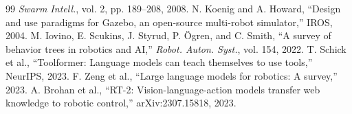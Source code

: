 \documentclass[10pt,twocolumn]{article}
\begin{document}
\begin{thebibliography}{99}
\emph{Swarm Intell.}, vol. 2, pp. 189--208, 2008.
 N. Koenig and A. Howard, ``Design and use paradigms for
Gazebo, an open-source multi-robot simulator,'' IROS, 2004.
 M. Iovino, E. Scukins, J. Styrud, P. Ögren, and C. Smith,
``A survey of behavior trees in robotics and AI,'' \emph{Robot. Auton. Syst.},
vol. 154, 2022.
 T. Schick et al., ``Toolformer: Language models can teach
themselves to use tools,'' NeurIPS, 2023.
 F. Zeng et al., ``Large language models for robotics: A
survey,'' 2023.
 A. Brohan et al., ``RT-2: Vision-language-action models transfer
web knowledge to robotic control,'' arXiv:2307.15818, 2023.
\end{thebibliography}
\end{document}
